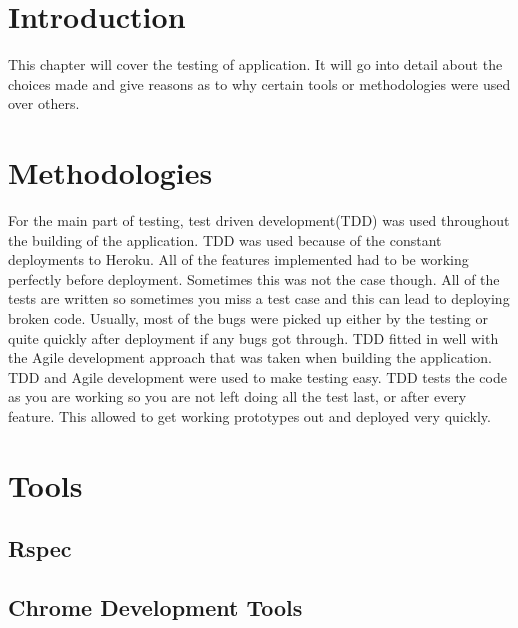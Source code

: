 \section{Introduction}
This chapter will cover the testing of application. It will go into detail about the choices made and give reasons as to why certain tools or methodologies were used over others.\\

\section{Methodologies}
For the main part of testing, test driven development(TDD) was used throughout the building of the application. TDD was used because of the constant deployments to Heroku. All of the features implemented had to be working perfectly before deployment. Sometimes this was not the case though. All of the tests are written so sometimes you miss a test case and this can lead to deploying broken code. Usually, most of the bugs were picked up either by the testing or quite quickly after deployment if any bugs got through. TDD fitted in well with the Agile development approach that was taken when building the application. TDD and Agile development were used to make testing easy. TDD tests the code as you are working so you are not left doing all the test last, or after every feature. This allowed to get working prototypes out and deployed very quickly.\\

\section{Tools}
\subsection{Rspec}
\subsection{Chrome Development Tools}

